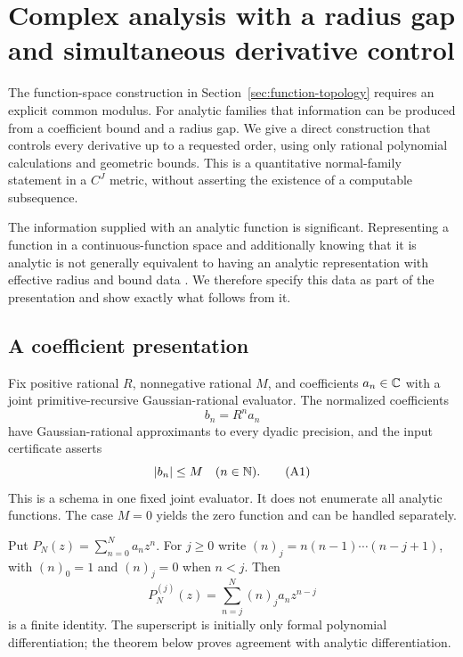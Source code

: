 \section{Complex analysis with a radius gap and simultaneous derivative control}
\label{sec:complex}

The function-space construction in Section~\ref{sec:function-topology}
requires an explicit common modulus. For analytic families that information
can be produced from a coefficient bound and a radius gap. We give a
direct construction that controls every derivative up to a requested order,
using only rational polynomial calculations and geometric bounds.
This is a quantitative normal-family statement in a \(C^J\) metric, without
asserting the existence of a computable subsequence.

The information supplied with an analytic function is significant.
Representing a function in a continuous-function space and additionally
knowing that it is analytic is not generally equivalent to having an analytic
representation with effective radius and bound data
\cite{PaulySteinberg2018}. We therefore specify this data as part of the
presentation and show exactly what follows from it.

\subsection{A coefficient presentation}

Fix positive rational \(R\), nonnegative rational \(M\), and coefficients
\(a_n\in\mathbb C\) with a joint primitive-recursive Gaussian-rational evaluator.
The normalized coefficients
\[
                         b_n=R^n a_n
\]
have Gaussian-rational approximants to every dyadic precision, and the input
certificate asserts
\[
                             |b_n|\leq M\quad(n\in\mathbb N).
\tag{A1}
\]
This is a schema in one fixed joint evaluator. It does not enumerate all
analytic functions. The case \(M=0\) yields the zero function and can be
handled separately.

Put \(P_N(z)=\sum_{n=0}^Na_nz^n\).
For \(j\geq0\) write
\((n)_j=n(n-1)\cdots(n-j+1)\), with \((n)_0=1\) and
\((n)_j=0\) when \(n<j\). Then
\[
                 P_N^{(j)}(z)=
                   \sum_{n=j}^N(n)_j a_n z^{n-j}
\]
is a finite identity. The superscript is initially only formal polynomial
differentiation; the theorem below proves agreement with analytic
differentiation.

